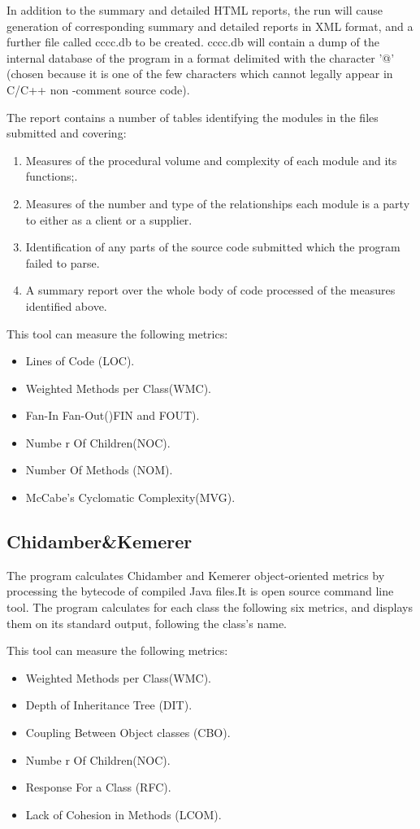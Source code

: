 In addition to the summary and detailed HTML reports, the run will cause generation of corresponding summary and detailed reports in XML format, and a further file called cccc.db to be created. cccc.db will contain a dump of the internal database of the program in a format delimited with the character '@' (chosen because it is one of the few characters which cannot legally appear in C/C++ non -comment source code).

The report contains a number of tables identifying the modules in the files submitted and covering:
\begin{enumerate}
	\item Measures of the procedural volume and complexity of each module and its functions;. 
	\item Measures of the number and type of the relationships each module is a party to either as a client or a supplier.
	\item Identification of any parts of the source code submitted which the program failed to parse.
	\item A summary report over the whole body of code processed of the measures identified above.
\end{enumerate}

This tool can measure the following metrics:
\begin{itemize}
	\item Lines of Code (LOC). 
	\item Weighted Methods per Class(WMC).
	\item Fan-In Fan-Out()FIN and FOUT).
	\item Numbe r Of Children(NOC).
	\item Number Of Methods (NOM).
	\item McCabe's Cyclomatic Complexity(MVG).
\end{itemize}

\subsection{Chidamber\&Kemerer}

The program calculates Chidamber and Kemerer object-oriented metrics by processing the bytecode of compiled Java files.It is open source command line tool. The program calculates for each class the following six metrics, and displays them on its standard output, following the class's name.

This tool can measure the following metrics:

\begin{itemize}
	\item Weighted Methods per Class(WMC).
	\item Depth of Inheritance Tree (DIT).
	\item Coupling Between Object classes (CBO).
	\item Numbe r Of Children(NOC).
	\item Response For a Class (RFC).
	\item Lack of Cohesion in Methods (LCOM).
\end{itemize}

